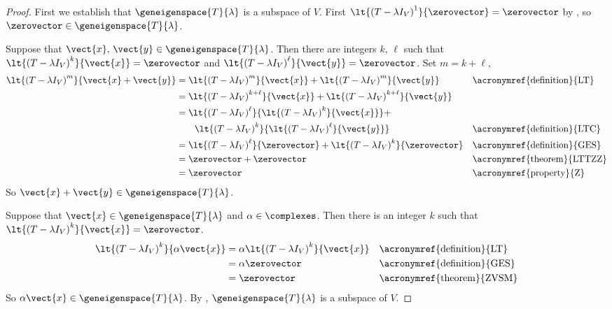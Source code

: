\begin{proof}
First we establish that $\geneigenspace{T}{\lambda}$ is a subspace of $V$.  First
$\lt{\left(T-\lambda I_V\right)^1}{\zerovector}=\zerovector$ by , so $\zerovector\in\geneigenspace{T}{\lambda}$.\par
%
Suppose that $\vect{x},\,\vect{y}\in\geneigenspace{T}{\lambda}$.  Then there are integers $k,\,\ell$ such that $\lt{\left(T-\lambda I_V\right)^k}{\vect{x}}=\zerovector$ and $\lt{\left(T-\lambda I_V\right)^\ell}{\vect{y}}=\zerovector$.  Set $m=k+\ell$,
%
\begin{align*}
\lt{\left(T-\lambda I_V\right)^m}{\vect{x}+\vect{y}}
&=
\lt{\left(T-\lambda I_V\right)^m}{\vect{x}}+
\lt{\left(T-\lambda I_V\right)^m}{\vect{y}}
&&\text{\acronymref{definition}{LT}}\\
%
&=
\lt{\left(T-\lambda I_V\right)^{k+\ell}}{\vect{x}}+
\lt{\left(T-\lambda I_V\right)^{k+\ell}}{\vect{y}}\\
%
&=
\lt{\left(T-\lambda I_V\right)^{\ell}}{\lt{\left(T-\lambda I_V\right)^{k}}{\vect{x}}}+\\
&\quad\quad\lt{\left(T-\lambda I_V\right)^{k}}{\lt{\left(T-\lambda I_V\right)^{\ell}}{\vect{y}}}
&&\text{\acronymref{definition}{LTC}}\\
%
&=
\lt{\left(T-\lambda I_V\right)^{\ell}}{\zerovector}+
\lt{\left(T-\lambda I_V\right)^{k}}{\zerovector}
&&\text{\acronymref{definition}{GES}}\\
%
&=\zerovector+\zerovector&&\text{\acronymref{theorem}{LTTZZ}}\\
&=\zerovector&&\text{\acronymref{property}{Z}}
%
\end{align*}
%
So $\vect{x}+\vect{y}\in\geneigenspace{T}{\lambda}$.\par
%
Suppose that $\vect{x}\in\geneigenspace{T}{\lambda}$ and $\alpha\in\complexes$.  Then there is an integer $k$ such that $\lt{\left(T-\lambda I_V\right)^k}{\vect{x}}=\zerovector$.
%
\begin{align*}
\lt{\left(T-\lambda I_V\right)^k}{\alpha\vect{x}}
&=\alpha\lt{\left(T-\lambda I_V\right)^k}{\vect{x}}&&\text{\acronymref{definition}{LT}}\\
&=\alpha\zerovector&&\text{\acronymref{definition}{GES}}\\
&=\zerovector&&\text{\acronymref{theorem}{ZVSM}}
\end{align*}
%
So $\alpha\vect{x}\in\geneigenspace{T}{\lambda}$.  By , $\geneigenspace{T}{\lambda}$ is a subspace of $V$.\par

\end{proof}
